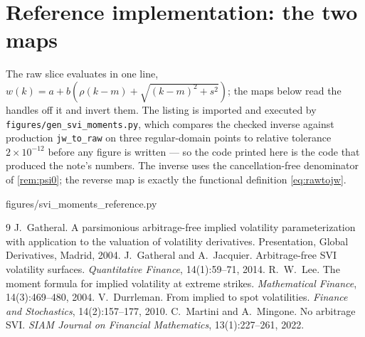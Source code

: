 \documentclass[11pt]{article}
\begin{document}
\section{Reference implementation: the two maps}
\label{app:ref}

The raw slice evaluates in one line, $w(k)=a+b(\rho(k-m)+\sqrt{(k-m)^2+s^2})$;
the maps below read the handles off it and invert them.  The listing is imported
and executed by \texttt{figures/gen\_svi\_moments.py}, which compares the checked
inverse against production \texttt{jw\_to\_raw} on three regular-domain points to
relative tolerance $2\times10^{-12}$ before any figure is written --- so the code
printed here is the code that produced the note's numbers.  The inverse uses the
cancellation-free denominator of \cref{rem:psi0}; the reverse map is exactly the
functional definition \eqref{eq:rawtojw}.

%
{figures/svi_moments_reference.py}

\begin{thebibliography}{9}
 J.~Gatheral. A parsimonious arbitrage-free implied
volatility parameterization with application to the valuation of volatility
derivatives. Presentation, Global Derivatives, Madrid, 2004.
 J.~Gatheral and A.~Jacquier. Arbitrage-free SVI
volatility surfaces. \emph{Quantitative Finance}, 14(1):59--71, 2014.
 R.~W.~Lee. The moment formula for implied volatility at
extreme strikes. \emph{Mathematical Finance}, 14(3):469--480, 2004.
 V.~Durrleman. From implied to spot volatilities.
\emph{Finance and Stochastics}, 14(2):157--177, 2010.
 C.~Martini and A.~Mingone. No arbitrage SVI.
\emph{SIAM Journal on Financial Mathematics}, 13(1):227--261, 2022.
\end{thebibliography}
\end{document}
